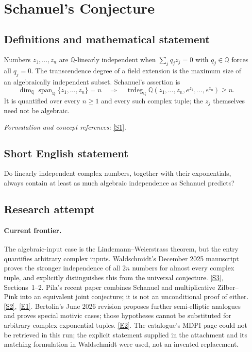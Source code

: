 \documentclass[11pt,a4paper]{article}
\newcommand{\Q}{\mathbb{Q}}
\newcommand{\sref}[2]{\hyperlink{source:#1:#2}{[S#2]}}
\newcommand{\eref}[2]{\hyperlink{extra:#1:#2}{[E#2]}}
\newif\ifshowcatalogue
\newcommand{\cataloguescope}[1]{\ifshowcatalogue
 \paragraph{Exact scope in the supplied catalogue.}
 \begin{quote}\small #1\end{quote}\fi}
\numberwithin{equation}{section}
\begin{document}
\setcounter{section}{0}
\clearpage
\section*{\texorpdfstring{Schanuel's Conjecture}{Schanuel's Conjecture}}\label{statement}
\subsection{Definitions and mathematical statement}
Numbers $z_1,\ldots,z_n$ are $\Q$-linearly independent when $\sum_jq_jz_j=0$ with $q_j\in\Q$ forces all $q_j=0$. The transcendence degree of a field extension is the maximum size of an algebraically independent subset. Schanuel's assertion is
\[
 \dim_{\Q}\operatorname{span}_{\Q}\{z_1,\ldots,z_n\}=n
 \quad\Longrightarrow\quad
 \operatorname{trdeg}_{\Q}\Q(z_1,\ldots,z_n,e^{z_1},\ldots,e^{z_n})\ge n.
\]
It is quantified over every $n\ge1$ and every such complex tuple; the $z_j$ themselves need not be algebraic.
\par\smallskip\textit{Formulation and concept references:} \sref{statement}{1}.
\cataloguescope{Prove or disprove that if z\_1,...,z\_n in C are linearly independent over Q, then the field Q(z\_1,...,z\_n,e\textasciicircum{}\{z\_1\},...,e\textasciicircum{}\{z\_n\}) has transcendence degree at least n over Q.}
\subsection{Short English statement}
Do linearly independent complex numbers, together with their exponentials, always contain at least as much algebraic independence as Schanuel predicts?
\subsection{Research attempt}

\paragraph{Current frontier.}
The algebraic-input case is the Lindemann--Weierstrass theorem, but the
entry quantifies arbitrary complex inputs. Waldschmidt's December 2025
manuscript proves the stronger independence of all $2n$ numbers for
almost every complex tuple, and explicitly distinguishes this from the
universal conjecture. \sref{statement}{3}, Sections~1--2. Pila's recent paper
combines Schanuel and multiplicative Zilber--Pink into an equivalent joint
conjecture; it is not an unconditional proof of either. \sref{statement}{2},
\eref{statement}{1}. Bertolin's June 2026 revision proposes further
semi-elliptic analogues and proves special motivic cases; those hypotheses
cannot be substituted for arbitrary complex exponential tuples.
\eref{statement}{2}. The catalogue's MDPI page could not be retrieved in this
run; the explicit statement supplied in the attachment and its matching
formulation in Waldschmidt were used, not an invented replacement.
\end{document}
